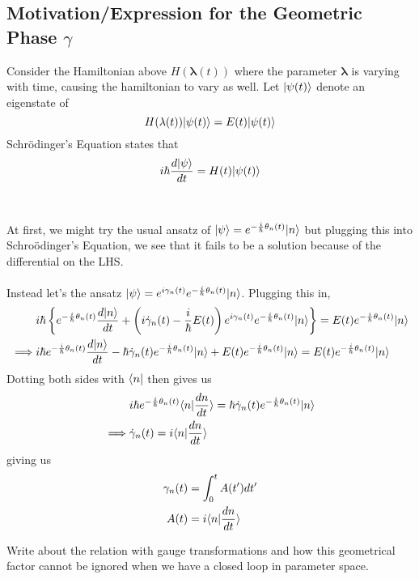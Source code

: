 \documentclass[11pt]{article}
\begin{document}
\subsection{Motivation/Expression for the Geometric Phase $\gamma$}
Consider the Hamiltonian above $H(\mathbf{\lambda}(t))$ where the parameter $\mathbf{\lambda}$ is varying with time, causing the hamiltonian to vary as well. Let $\lvert\psi(t)\rangle$ denote an eigenstate of $$H(\mathbf{\lambda}(t)) \lvert\psi(t)\rangle = E(t)\lvert\psi(t)\rangle $$
Schr\"odinger's Equation states that $$ i\hbar\frac{d\lvert\psi\rangle}{dt} = H(t)\lvert\psi(t)\rangle $$
\\
\\
At first, we might try the usual ansatz of $\lvert\psi\rangle = e^{-\frac{i}{\hbar}\theta_n(t)} \lvert n\rangle$ but plugging this into Schro\"odinger's Equation, we see that it fails to be a solution because of the differential on the LHS.
\\
\\
Instead let's the ansatz $\lvert\psi\rangle = e^{i\gamma_n(t)} e^{-\frac{i}{\hbar}\theta_n(t)} \lvert n\rangle$. Plugging this in,
\begin{align*}
  &i\hbar \left\{ e^{-\frac{i}{\hbar}\theta_n(t)} \frac{d\lvert n\rangle}{dt} + \left( i \dot{\gamma}_n(t) - \frac{i}{\hbar} E(t) \right) e^{i\gamma_n(t)} e^{-\frac{i}{\hbar}\theta_n(t)} \lvert n\rangle \right\} = E(t)e^{-\frac{i}{\hbar}\theta_n(t)} \lvert n\rangle \\
  \implies& i\hbar e^{-\frac{i}{\hbar}\theta_n(t)}  \frac{d\lvert n\rangle}{dt} -\hbar \dot{\gamma}_n(t) e^{-\frac{i}{\hbar}\theta_n(t)} \lvert n\rangle  + E(t)e^{-\frac{i}{\hbar}\theta_n(t)} \lvert n\rangle = E(t)e^{-\frac{i}{\hbar}\theta_n(t)} \lvert n\rangle \\
\end{align*}
Dotting both sides with $\langle n\rvert$ then gives us 
\begin{align*}
  &i\hbar e^{-\frac{i}{\hbar}\theta_n(t)} \langle n | \frac{dn}{dt} \rangle = \hbar \dot{\gamma}_n(t)e^{-\frac{i}{\hbar}\theta_n(t)} \lvert n\rangle  \\
  \implies& \dot{\gamma}_n(t) = i\langle n | \frac{dn}{dt} \rangle
\end{align*}
giving us 
\begin{align*}
  \gamma_n(t) &= \int_0^{t} A(t') dt' \\
  A(t) &= i \langle n | \frac{dn}{dt} \rangle
\end{align*}
\begin{note}
  {Write about the relation with gauge transformations and how this geometrical factor cannot be ignored when we have a closed loop in parameter space.}
\end{note}
\end{document}
